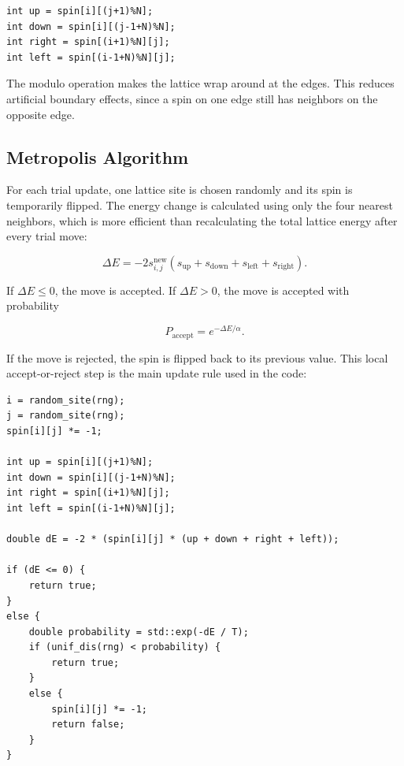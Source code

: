\documentclass[11pt]{article}
\let\oldsubsection\subsection
\renewcommand{\subsection}[1]{\Needspace{2\baselineskip}\oldsubsection{#1}}
\begin{document}
\begin{lstlisting}[style=cppstyle]
int up = spin[i][(j+1)%N];
int down = spin[i][(j-1+N)%N];
int right = spin[(i+1)%N][j];
int left = spin[(i-1+N)%N][j];
\end{lstlisting}

The modulo operation makes the lattice wrap around at the edges. This reduces artificial boundary effects, since a spin on one edge still has neighbors on the opposite edge.

\subsection{Metropolis Algorithm}

For each trial update, one lattice site is chosen randomly and its spin is temporarily flipped. The energy change is calculated using only the four nearest neighbors, which is more efficient than recalculating the total lattice energy after every trial move:

\medskip

\begin{equation}
\Delta E=-2s_{i,j}^{\mathrm{new}}
\left(s_{\mathrm{up}}+s_{\mathrm{down}}+s_{\mathrm{left}}+s_{\mathrm{right}}\right).
\end{equation}

\medskip
If $\Delta E \leq 0$, the move is accepted. If $\Delta E>0$, the move is accepted with probability

\medskip

\begin{equation}
P_{\mathrm{accept}}=e^{-\Delta E/\alpha}.
\end{equation}

\medskip
If the move is rejected, the spin is flipped back to its previous value. This local accept-or-reject step is the main update rule used in the code:

\begin{lstlisting}[style=cppstyle]
i = random_site(rng);
j = random_site(rng);
spin[i][j] *= -1;

int up = spin[i][(j+1)%N];
int down = spin[i][(j-1+N)%N];
int right = spin[(i+1)%N][j];
int left = spin[(i-1+N)%N][j];

double dE = -2 * (spin[i][j] * (up + down + right + left));

if (dE <= 0) {
    return true;
}
else {
    double probability = std::exp(-dE / T);
    if (unif_dis(rng) < probability) {
        return true;
    }
    else {
        spin[i][j] *= -1;
        return false;
    }
}
\end{lstlisting}
\end{document}
